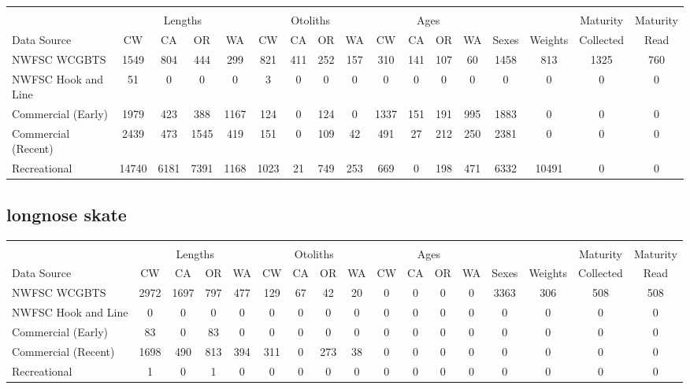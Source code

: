 \documentclass[12pt,]{article}
\begin{document}
\begin{table}[ht]
\centering
\begingroup\fontsize{10pt}{10pt}\selectfont
\begin{tabular}{|l|cccc|cccc|cccc|c|c|c|c|}
  \hline
 &  &  &  &  &  &  &  &  &  &  &  &  &  &  &  &  \\ 
   & \multicolumn{4}{c}{Lengths} &  \multicolumn{4}{c}{Otoliths} & \multicolumn{4}{c}{Ages} &  & & Maturity & Maturity\\
 Data Source & CW & CA & OR & WA & CW & CA & OR & WA & CW & CA & OR & WA & Sexes & Weights & Collected & Read\\
 \hline
NWFSC WCGBTS & 1549 & 804 & 444 & 299 & 821 & 411 & 252 & 157 & 310 & 141 & 107 & 60 & 1458 & 813 & 1325 & 760 \\ 
  NWFSC Hook and Line & 51 & 0 & 0 & 0 & 3 & 0 & 0 & 0 & 0 & 0 & 0 & 0 & 0 & 0 & 0 & 0 \\ 
  Commercial (Early) & 1979 & 423 & 388 & 1167 & 124 & 0 & 124 & 0 & 1337 & 151 & 191 & 995 & 1883 & 0 & 0 & 0 \\ 
  Commercial (Recent) & 2439 & 473 & 1545 & 419 & 151 & 0 & 109 & 42 & 491 & 27 & 212 & 250 & 2381 & 0 & 0 & 0 \\ 
  Recreational & 14740 & 6181 & 7391 & 1168 & 1023 & 21 & 749 & 253 & 669 & 0 & 198 & 471 & 6332 & 10491 & 0 & 0 \\ 
   \hline
\end{tabular}
\endgroup
\end{table}

\FloatBarrier  

\newpage  

\subsection{longnose skate}\label{longnose-skate}

\begin{table}[ht]
\centering
\begingroup\fontsize{10pt}{10pt}\selectfont
\begin{tabular}{|l|cccc|cccc|cccc|c|c|c|c|}
  \hline
 &  &  &  &  &  &  &  &  &  &  &  &  &  &  &  &  \\ 
   & \multicolumn{4}{c}{Lengths} &  \multicolumn{4}{c}{Otoliths} & \multicolumn{4}{c}{Ages} &  & & Maturity & Maturity\\
 Data Source & CW & CA & OR & WA & CW & CA & OR & WA & CW & CA & OR & WA & Sexes & Weights & Collected & Read\\
 \hline
NWFSC WCGBTS & 2972 & 1697 & 797 & 477 & 129 & 67 & 42 & 20 & 0 & 0 & 0 & 0 & 3363 & 306 & 508 & 508 \\ 
  NWFSC Hook and Line & 0 & 0 & 0 & 0 & 0 & 0 & 0 & 0 & 0 & 0 & 0 & 0 & 0 & 0 & 0 & 0 \\ 
  Commercial (Early) & 83 & 0 & 83 & 0 & 0 & 0 & 0 & 0 & 0 & 0 & 0 & 0 & 0 & 0 & 0 & 0 \\ 
  Commercial (Recent) & 1698 & 490 & 813 & 394 & 311 & 0 & 273 & 38 & 0 & 0 & 0 & 0 & 0 & 0 & 0 & 0 \\ 
  Recreational & 1 & 0 & 1 & 0 & 0 & 0 & 0 & 0 & 0 & 0 & 0 & 0 & 0 & 0 & 0 & 0 \\ 
   \hline
\end{tabular}
\endgroup
\end{table}
\end{document}
